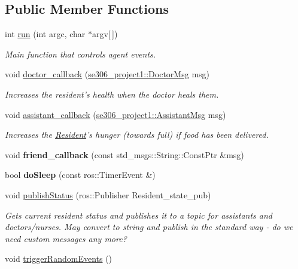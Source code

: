 \subsection*{Public Member Functions}
\begin{DoxyCompactItemize}
\item 
int \hyperlink{classResident_a43dac53b6516e2d30c3df845efc2e547}{run} (int argc, char $\ast$argv\mbox{[}$\,$\mbox{]})
\begin{DoxyCompactList}\small\item\em Main function that controls agent events. \end{DoxyCompactList}\item 
void \hyperlink{classResident_a6d8fbbc8a60508ec913fb41d7e743094}{doctor\-\_\-callback} (\hyperlink{structse306__project1_1_1DoctorMsg__}{se306\-\_\-project1\-::\-Doctor\-Msg} msg)
\begin{DoxyCompactList}\small\item\em Increases the resident's health when the doctor heals them. \end{DoxyCompactList}\item 
void \hyperlink{classResident_aa715d491e917de6f621593f0d1f01bd6}{assistant\-\_\-callback} (\hyperlink{structse306__project1_1_1AssistantMsg__}{se306\-\_\-project1\-::\-Assistant\-Msg} msg)
\begin{DoxyCompactList}\small\item\em Increases the \hyperlink{classResident}{Resident}'s hunger (towards full) if food has been delivered. \end{DoxyCompactList}\item 
\hypertarget{classResident_a33352541969842e16e716ba61fb242f1}{void {\bfseries friend\-\_\-callback} (const std\-\_\-msgs\-::\-String\-::\-Const\-Ptr \&msg)}\label{classResident_a33352541969842e16e716ba61fb242f1}

\item 
\hypertarget{classResident_accf6a08b67397acdbcc9c81226e5d746}{bool {\bfseries do\-Sleep} (const ros\-::\-Timer\-Event \&)}\label{classResident_accf6a08b67397acdbcc9c81226e5d746}

\item 
\hypertarget{classResident_a98b4c44b2cc5f0212f8889088bc881e1}{void \hyperlink{classResident_a98b4c44b2cc5f0212f8889088bc881e1}{publish\-Status} (ros\-::\-Publisher Resident\-\_\-state\-\_\-pub)}\label{classResident_a98b4c44b2cc5f0212f8889088bc881e1}

\begin{DoxyCompactList}\small\item\em Gets current resident status and publishes it to a topic for assistants and doctors/nurses. May convert to string and publish in the standard way -\/ do we need custom messages any more? \end{DoxyCompactList}\item 
\hypertarget{classResident_afb1119b2ff73ad3aa48732caee7b3d60}{void \hyperlink{classResident_afb1119b2ff73ad3aa48732caee7b3d60}{trigger\-Random\-Events} ()}\label{classResident_afb1119b2ff73ad3aa48732caee7b3d60}


\end{DoxyCompactItemize}
